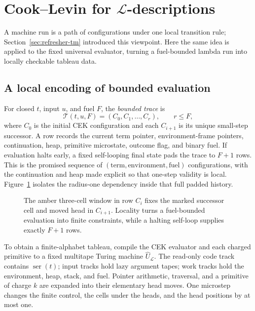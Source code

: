 \section{Cook--Levin for \texorpdfstring{\(\mathcal L\)}{L}-descriptions}
\label{sec:l-cook-levin}

\begin{reminder}
A machine run is a path of configurations under one local transition rule;
Section~\ref{sec:refresher-tm} introduced this viewpoint.  Here the same idea
is applied to the fixed universal evaluator, turning a fuel-bounded lambda run
into locally checkable tableau data.
\end{reminder}

\subsection{A local encoding of bounded evaluation}

For closed \(t\), input \(u\), and fuel \(F\), the \emph{bounded trace} is
\[
 \mathcal T(t,u,F)=(C_0,C_1,\ldots,C_r),\qquad r\leq F,
\]
where \(C_0\) is the initial CEK configuration and each \(C_{i+1}\) is its
unique small-step successor.  A row records the current term pointer,
environment-frame pointers, continuation, heap, primitive microstate, outcome
flag, and binary fuel.  If evaluation halts early, a fixed self-looping final
state pads the trace to \(F+1\) rows.  This is the promised sequence of
\((\text{term},\text{environment},\text{fuel})\) configurations, with the
continuation and heap made explicit so that one-step validity is local.
Figure~\ref{fig:trace-tableau} isolates the radius-one dependency inside that
full padded history.

\begin{figure}[H]
\centering

\caption{The amber three-cell window in row \(C_i\) fixes the marked successor cell and moved head in \(C_{i+1}\).  Locality turns a fuel-bounded evaluation into finite constraints, while a halting self-loop supplies exactly \(F+1\) rows.}
\label{fig:trace-tableau}
\end{figure}

To obtain a finite-alphabet tableau, compile the CEK evaluator and each charged
primitive to a fixed multitape Turing machine \(\widehat U_{\mathcal L}\).
The read-only code track contains \(\operatorname{ser}(t)\); input tracks hold
lazy argument tapes; work tracks hold the environment, heap, stack, and fuel.
Pointer arithmetic, traversal, and a primitive of charge \(k\) are expanded
into their elementary head moves.  One microstep changes the finite control,
the cells under the heads, and the head positions by at most one.

